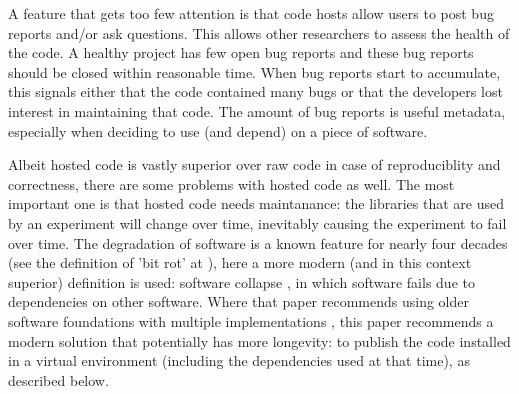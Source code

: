
A feature that gets too few attention is that code hosts
allow users to post bug reports and/or ask questions.
This allows other researchers to assess the health
of the code.
A healthy project has few open bug reports
and these bug reports should be closed within reasonable time.
When bug reports start to accumulate, this
signals either that the code contained many bugs or that
the developers lost interest in maintaining that code.
The amount of bug reports is useful metadata, 
especially when deciding to use (and depend) on a piece of software.

Albeit hosted code is vastly superior over raw code
in case of reproduciblity and correctness,
there are some problems with hosted code as well.
The most important one is that hosted code needs maintanance:
the libraries that are used by an experiment
will change over time, inevitably causing the experiment to fail
over time. 
The degradation of software is a known feature for nearly 
four decades (see the definition of 'bit rot' at \cite{steele1983hacker}),
here a more modern (and in this context superior)
definition is used: software collapse \cite{hinsen2019dealing},
in which software fails due to dependencies on other 
software.
Where that paper recommends using older software foundations 
with multiple implementations \cite{hinsen2019dealing},
this paper recommends a modern solution that potentially has more longevity:
to publish the code installed in a virtual environment
(including the dependencies used at that time), as described below.

